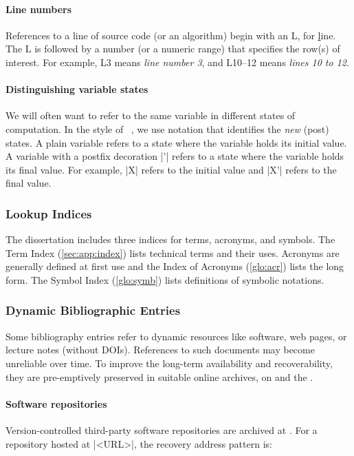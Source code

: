 \paragraph*{Line numbers}
References to a line of source code (or an algorithm) begin with an L, for
\underline{l}ine. The L is followed by a number (or a numeric range) that
specifies the row(s) of interest. For example, L3 means \emph{line number 3},
and L10--12 means \emph{lines 10 to 12}.

\paragraph*{Distinguishing variable states}
We will often want to refer to the same variable in different states of
computation. In the style of \emph{}~\cite{spivey1992}, we use notation that identifies the \emph{new}
(post) states. A plain variable refers to a state where the variable holds its
{initial} value. A variable with a postfix decoration \pr|'| refers to a state
where the variable holds its {final} value. For example, \pr|X| refers to the
initial value and \pr|X'| refers to the final value.

\subsubsection{Lookup Indices}

The dissertation includes three indices for terms, acronyms, and symbols. The
Term Index (\autoref{sec:app:index}) lists technical terms and their uses.
Acronyms are generally defined at first use and the Index of Acronyms
(\autoref{glo:acr}) lists the long form. The Symbol Index (\autoref{glo:symb})
lists definitions of symbolic notations.

\subsubsection{Dynamic Bibliographic Entries}
\label{sssec:dyn-bib}

Some bibliography entries refer to dynamic resources like software, web pages,
or lecture notes (without DOIs). References to such documents may become
unreliable over time. To improve the long-term availability and recoverability,
they are pre-emptively preserved in suitable online archives, on  and the .

\paragraph*{Software repositories}
Version-controlled third-party software repositories are archived at
\href{https://softwareheritage.org}{}. For a repository
hosted at \pr|<URL>|, the recovery address pattern is:

